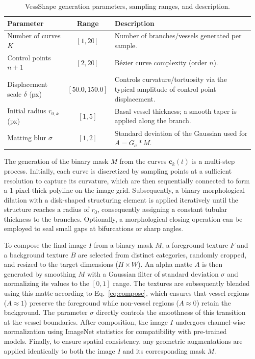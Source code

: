 \documentclass[%
reprint,
nofootinbib,
 amsmath,amssymb,
aps,
superscriptaddress,
showkeys,
longbibliography
]{revtex4-1}
\begin{document}
\begin{table}[t]
\caption{VessShape generation parameters, sampling ranges, and description.}
\label{tab:vessshape_params}
\centering
\begin{tabularx}{\textwidth}{l c X}
\hline
    \textbf{Parameter} & \textbf{Range} & \textbf{Description} \\
\hline
Number of curves $K$ & $[1,20]$ & Number of branches/vessels generated per sample. \\
Control points $n{+}1$ & $[2,20]$ & Bézier curve complexity (order $n$). \\
Displacement scale $\delta$ (px) & $[50.0,150.0]$ & Controls curvature/tortuosity via the typical amplitude of control-point displacement. \\
Initial radius $r_{0,k}$ (px) & $[1,5]$ & Basal vessel thickness; a smooth taper is applied along the branch. \\
Matting blur $\sigma$ & $[1,2]$ & Standard deviation of the Gaussian used for $A = G_{\sigma} * M$. \\

\hline
\end{tabularx}
\end{table}


The generation of the binary mask $M$ from the curves $\mathbf{c}_k(t)$ is a multi-step process. Initially, each curve is discretized by sampling points at a sufficient resolution to capture its curvature, which are then sequentially connected to form a 1-pixel-thick polyline on the image grid. Subsequently, a binary morphological dilation with a disk-shaped structuring element is applied iteratively until the structure reaches a radius of $r_0$, consequently assigning a constant tubular thickness to the branches. Optionally, a morphological closing operation can be employed to seal small gaps at bifurcations or sharp angles.

To compose the final image $I$ from a binary mask $M$, a foreground texture $F$ and a background texture $B$ are selected from distinct categories, randomly cropped, and resized to the target dimensions ($H \times W$). An alpha matte $A$ is then generated by smoothing $M$ with a Gaussian filter of standard deviation $\sigma$ and normalizing its values to the $[0, 1]$ range. The textures are subsequently blended using this matte according to Eq.~\ref{eq:compose}, which ensures that vessel regions ($A \approx 1$) preserve the foreground while non-vessel regions ($A \approx 0$) retain the background. The parameter $\sigma$ directly controls the smoothness of this transition at the vessel boundaries. After composition, the image $I$ undergoes channel-wise normalization using ImageNet statistics for compatibility with pre-trained models. Finally, to ensure spatial consistency, any geometric augmentations are applied identically to both the image $I$ and its corresponding mask $M$.
\end{document}
